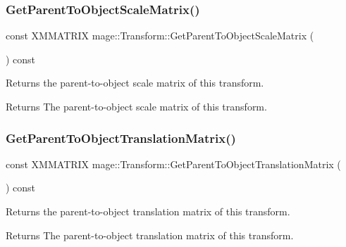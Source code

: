 \subsubsection{\texorpdfstring{Get\+Parent\+To\+Object\+Scale\+Matrix()}{GetParentToObjectScaleMatrix()}}
{\footnotesize\ttfamily const X\+M\+M\+A\+T\+R\+IX mage\+::\+Transform\+::\+Get\+Parent\+To\+Object\+Scale\+Matrix (\begin{DoxyParamCaption}{ }\end{DoxyParamCaption}) const\hspace{0.3cm}{\ttfamily [noexcept]}}

Returns the parent-\/to-\/object scale matrix of this transform.

\begin{DoxyReturn}{Returns}
The parent-\/to-\/object scale matrix of this transform. 
\end{DoxyReturn}
\hypertarget{structmage_1_1_transform_abc1bf609a4fc988ca8299ac4c67e4b25}{}\label{structmage_1_1_transform_abc1bf609a4fc988ca8299ac4c67e4b25} 
\subsubsection{\texorpdfstring{Get\+Parent\+To\+Object\+Translation\+Matrix()}{GetParentToObjectTranslationMatrix()}}
{\footnotesize\ttfamily const X\+M\+M\+A\+T\+R\+IX mage\+::\+Transform\+::\+Get\+Parent\+To\+Object\+Translation\+Matrix (\begin{DoxyParamCaption}{ }\end{DoxyParamCaption}) const\hspace{0.3cm}{\ttfamily [noexcept]}}

Returns the parent-\/to-\/object translation matrix of this transform.

\begin{DoxyReturn}{Returns}
The parent-\/to-\/object translation matrix of this transform. 
\end{DoxyReturn}
\hypertarget{structmage_1_1_transform_a4e133167aaded2194cb16eaa30ace40b}{}\label{structmage_1_1_transform_a4e133167aaded2194cb16eaa30ace40b} 
